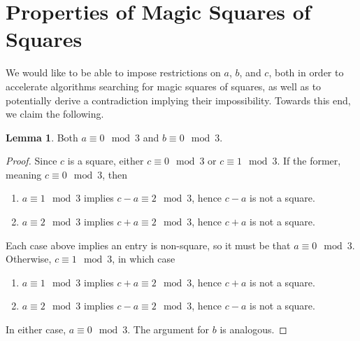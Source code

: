 \documentclass[11pt]{amsart}
\theoremstyle{definition}
\newtheorem{lem}[thm]{Lemma}
\begin{document}
\section{Properties of Magic Squares of Squares}
We would like to be able to impose restrictions on $a$, $b$, and $c$, both in order to accelerate algorithms searching for magic squares of squares, as well as to potentially derive a contradiction implying their impossibility. Towards this end, we claim the following.
\begin{lem}
  Both $a \equiv 0 \mod 3$ and $b \equiv 0 \mod 3$.
  \begin{proof}
    Since $c$ is a square, either $c \equiv 0 \mod 3$ or $c \equiv 1 \mod 3$. If the former, meaning $c \equiv 0 \mod 3$, then
    \begin{enumerate}
      \item $a \equiv 1 \mod 3$ implies $c - a \equiv 2 \mod 3$, hence $c - a$ is not a square.
      \item $a \equiv 2 \mod 3$ implies $c + a \equiv 2 \mod 3$, hence $c + a$ is not a square.
    \end{enumerate}
    Each case above implies an entry is non-square, so it must be that $a \equiv 0 \mod 3$. Otherwise, $c \equiv 1 \mod 3$, in which case
    \begin{enumerate}
      \item $a \equiv 1 \mod 3$ implies $c + a \equiv 2 \mod 3$, hence $c + a$ is not a square.
      \item $a \equiv 2 \mod 3$ implies $c - a \equiv 2 \mod 3$, hence $c - a$ is not a square.
    \end{enumerate}
    In either case, $a \equiv 0 \mod 3$. The argument for $b$ is analogous.
  \end{proof}
\end{lem}
\end{document}
